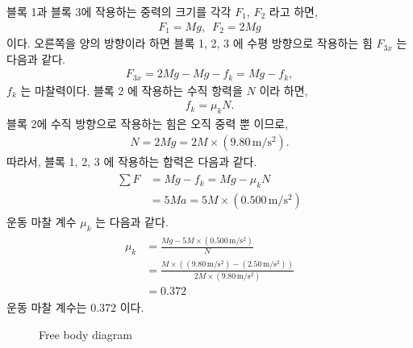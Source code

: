 \documentclass[floatfix,nofootinbib,superscriptaddress,fleqn,preprint]{revtex4}
\begin{document}
블록 1과 블록 3에 작용하는 중력의 크기를 각각 $F_1$, $F_2$ 라고 하면,
\begin{align}
  F_1 = Mg,\,\,\, F_2 = 2Mg
\end{align}
이다. 오른쪽을 양의 방향이라 하면 블록 1, 2, 3 에 수평 방향으로 작용하는 힘 $F_{3x}$ 는 
다음과 같다.
\begin{align}
  F_{3x} = 2Mg - Mg - f_k = Mg - f_k,
\end{align}
$f_k$ 는 마찰력이다. 블록 2 에 작용하는 수직 항력을 $N$ 이라 하면,
\begin{align}
  f_k = \mu_kN.
\end{align}
블록 2에 수직 방향으로 작용하는 힘은 오직 중력 뿐 이므로, 
\begin{align}
  N = 2Mg = 2M\times(9.80\,\mathrm{m/s^2}).
\end{align}
따라서, 블록 1, 2, 3 에 작용하는 합력은 다음과 같다.
\begin{align}
  \begin{split}
    \sum F &= Mg - f_k = Mg - \mu_kN \\
    &= 5Ma= 5M \times (0.500\,\mathrm{m/s^2})
  \end{split}
\end{align}
운동 마찰 계수 $\mu_k$ 는 다음과 같다.
\begin{align}
  \begin{split}
    \mu_k &= \frac{Mg - 5M \times (0.500\,\mathrm{m/s^2})}{N} \\
    &= \frac{M\times((9.80\,\mathrm{m/s^2})-(2.50\,\mathrm{m/s^2}))}
    {2M\times(9.80\,\mathrm{m/s^2})}  \\
    &= 0.372
  \end{split}
\end{align}
운동 마찰 계수는 0.372 이다.

\begin{figure}
   \caption{Free body diagram}
\end{figure}
\end{document}
